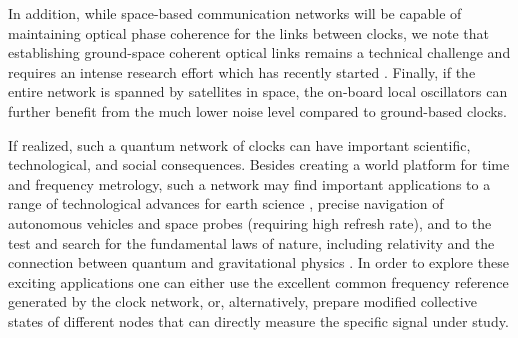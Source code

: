 In addition, while space-based communication networks will be capable
of maintaining optical phase coherence for the links between clocks, we note
that establishing ground-space coherent optical links remains a technical
challenge and requires an intense research effort which has recently started
\cite{Djerroud2010}.
Finally, if the entire network is spanned by satellites in space, the on-board
local oscillators can further benefit from the much lower noise level compared
to ground-based clocks.

If realized, such a quantum network of clocks can have important scientific,
technological, and social consequences. Besides creating a world platform for
time and frequency metrology, such a network may find important applications to
a range of technological advances for earth science \cite{Tapley2005},
precise navigation of autonomous vehicles and space probes (requiring high
 refresh rate), and to the test and search for the fundamental laws of
nature, including relativity and the connection between quantum and
gravitational physics \cite{Abramovici1992, Seidel2007, Schiller2008, Wolf2008}.
In order to explore these exciting applications one can either use the excellent
common frequency reference generated by the clock network, or, alternatively,
prepare modified collective states of different nodes that can directly measure
the specific signal under study. 
 






